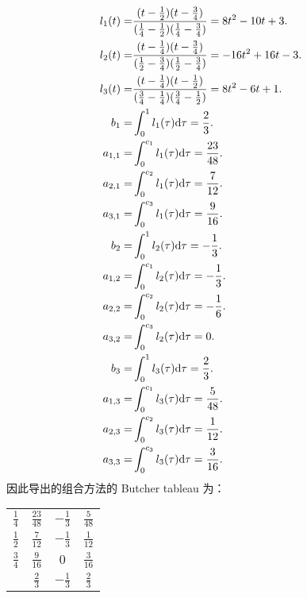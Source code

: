 \documentclass[lang=cn,a4paper,newtx,bibend=bibtex]{elegantpaper}
\begin{document}
\begin{solution}
  \begin{equation*}
    \begin{aligned}
      l_1(t)  = & \dfrac{(t-\frac 12)(t-\frac 34)}{(\frac 14-\frac 12)(\frac 14-\frac 34)} = 8t^2-10t+3. & \\
      l_2(t)  = & \dfrac{(t-\frac 14)(t-\frac 34)}{(\frac 12-\frac 34)(\frac 12-\frac 34)} = -16t^2+16t-3. & \\
      l_3(t)  = & \dfrac{(t-\frac 14)(t-\frac 12)}{(\frac 34-\frac 14)(\frac 34-\frac 12)} = 8t^2-6t+1. & \\
      b_1     = & \int_{0}^{1}{l_1(\tau)}{\mathrm{d} {\tau}} = \frac 23. & \\
      a_{1,1} = & \int_{0}^{c_1}{l_1(\tau)}{\mathrm{d} {\tau}} = \frac {23}{48}. & \\
      a_{2,1} = & \int_{0}^{c_2}{l_1(\tau)}{\mathrm{d} {\tau}} = \frac {7}{12}. & \\
      a_{3,1} = & \int_{0}^{c_3}{l_1(\tau)}{\mathrm{d} {\tau}} = \frac {9}{16}. & \\
      b_2     = & \int_{0}^{1}{l_2(\tau)}{\mathrm{d} {\tau}} = -\frac 13. & \\
      a_{1,2} = & \int_{0}^{c_1}{l_2(\tau)}{\mathrm{d} {\tau}} = -\frac 13. & \\
      a_{2,2} = & \int_{0}^{c_2}{l_2(\tau)}{\mathrm{d} {\tau}} = -\frac 16. & \\
      a_{3,2} = & \int_{0}^{c_3}{l_2(\tau)}{\mathrm{d} {\tau}} = 0. & \\
      b_3     = & \int_{0}^{1}{l_3(\tau)}{\mathrm{d} {\tau}} = \frac 23. & \\
      a_{1,3} = & \int_{0}^{c_1}{l_3(\tau)}{\mathrm{d} {\tau}} = \frac {5}{48}. & \\
      a_{2,3} = & \int_{0}^{c_2}{l_3(\tau)}{\mathrm{d} {\tau}} = \frac {1}{12}. & \\
      a_{3,3} = & \int_{0}^{c_3}{l_3(\tau)}{\mathrm{d} {\tau}} = \frac {3}{16}. & \\
    \end{aligned}
  \end{equation*}
  因此导出的组合方法的 Butcher tableau 为：
  \begin{table*}[h!]
    \begin{center}
      \begin{tabular}{c|ccc}
        $\frac 14$ & $\frac {23}{48}$ & $-\frac 13$ & $\frac {5}{48}$ \\
        $\frac 12$ & $\frac {7}{12}$ & $-\frac 13$ & $\frac {1}{12}$ \\
        $\frac 34$ & $\frac {9}{16}$ & $0$ & $\frac {3}{16}$ \\
        \hline
        & $\frac 23$ & $-\frac 13$ & $\frac 23$ \\
      \end{tabular}
    \end{center}
  \end{table*}
\end{solution}
\end{document}
